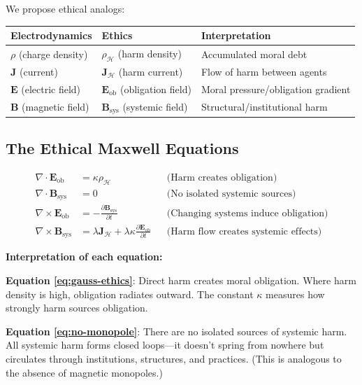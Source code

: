 \documentclass[12pt,letterpaper]{article}
\theoremstyle{definition}
\theoremstyle{remark}
\newcommand{\harm}{\mathcal{H}}
\begin{document}
We propose ethical analogs:

\begin{center}
\begin{tabular}{lll}
\toprule
\textbf{Electrodynamics} & \textbf{Ethics} & \textbf{Interpretation} \\
\midrule
$\rho$ (charge density) & $\rho_\harm$ (harm density) & Accumulated moral debt \\
$\mathbf{J}$ (current) & $\mathbf{J}_\harm$ (harm current) & Flow of harm between agents \\
$\mathbf{E}$ (electric field) & $\mathbf{E}_\text{ob}$ (obligation field) & Moral pressure/obligation gradient \\
$\mathbf{B}$ (magnetic field) & $\mathbf{B}_\text{sys}$ (systemic field) & Structural/institutional harm \\
\bottomrule
\end{tabular}
\end{center}

\subsection{The Ethical Maxwell Equations}

\begin{align}
\nabla \cdot \mathbf{E}_\text{ob} &= \kappa \rho_\harm && \text{(Harm creates obligation)} \label{eq:gauss-ethics} \\
\nabla \cdot \mathbf{B}_\text{sys} &= 0 && \text{(No isolated systemic sources)} \label{eq:no-monopole} \\
\nabla \times \mathbf{E}_\text{ob} &= -\frac{\partial \mathbf{B}_\text{sys}}{\partial t} && \text{(Changing systems induce obligation)} \label{eq:faraday-ethics} \\
\nabla \times \mathbf{B}_\text{sys} &= \lambda \mathbf{J}_\harm + \lambda \kappa \frac{\partial \mathbf{E}_\text{ob}}{\partial t} && \text{(Harm flow creates systemic effects)} \label{eq:ampere-ethics}
\end{align}

\textbf{Interpretation of each equation:}

\textbf{Equation \ref{eq:gauss-ethics}}: Direct harm creates moral obligation. Where harm density is high, obligation radiates outward. The constant $\kappa$ measures how strongly harm sources obligation.

\textbf{Equation \ref{eq:no-monopole}}: There are no isolated sources of systemic harm. All systemic harm forms closed loops---it doesn't spring from nowhere but circulates through institutions, structures, and practices. (This is analogous to the absence of magnetic monopoles.)
\end{document}
